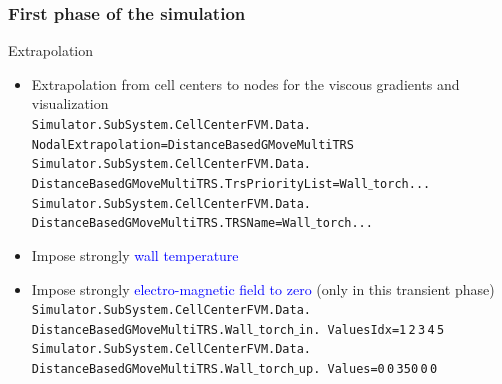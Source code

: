 \documentclass[compress,10pt]{beamer}
\begin{document}
\begin{frame}
\frametitle{First phase of the simulation}
\vspace*{-0.2cm}
  \begin{block}{Extrapolation}
\begin{itemize}
\item Extrapolation from cell centers to nodes for the viscous gradients and visualization \\
\hspace*{-0.2cm}\texttt{\small{Simulator.SubSystem.CellCenterFVM.Data.
\hspace*{0.1cm} NodalExtrapolation=DistanceBasedGMoveMultiTRS}}\\
\hspace*{-0.2cm}\texttt{\small{Simulator.SubSystem.CellCenterFVM.Data.
\hspace*{0.1cm} DistanceBasedGMoveMultiTRS.TrsPriorityList=Wall$\_$torch...}}\\
\hspace*{-0.2cm}\texttt{\small{Simulator.SubSystem.CellCenterFVM.Data.
\hspace*{0.1cm} DistanceBasedGMoveMultiTRS.TRSName=Wall$\_$torch...}}
 \item Impose strongly \textcolor{blue}{wall temperature}
 \item Impose strongly \textcolor{blue}{electro-magnetic field to zero} (only in this transient phase)\\
\texttt{\small{Simulator.SubSystem.CellCenterFVM.Data.
\hspace*{0.1cm} DistanceBasedGMoveMultiTRS.Wall$\_$torch$\_$in.
\hspace*{6cm} ValuesIdx=1$\,$2$\,$3$\,$4$\,$5}}
\texttt{\small{Simulator.SubSystem.CellCenterFVM.Data.
\hspace*{0.5cm} DistanceBasedGMoveMultiTRS.Wall$\_$torch$\_$up.
\hspace*{6cm} Values=0$\,$0$\,$350$\,$0$\,$0}}
\end{itemize}
  \end{block}
 \end{frame}
\end{document}
